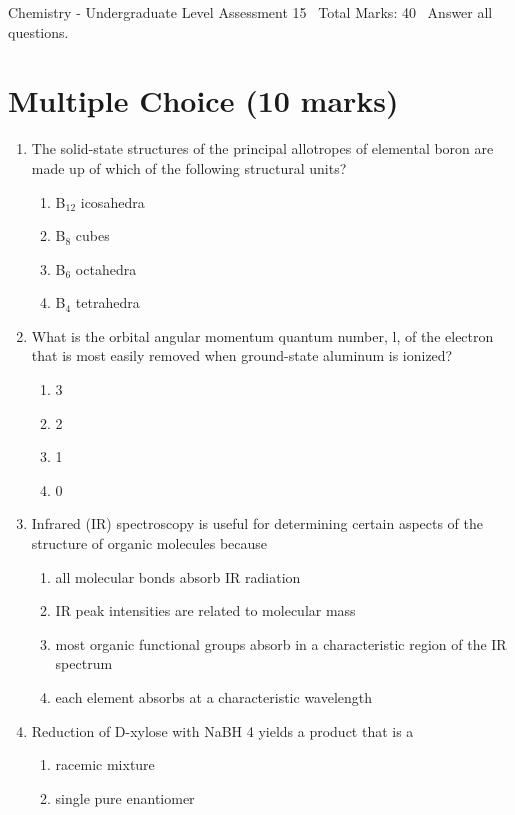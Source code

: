 \documentclass[12pt]{article}
\begin{document}
\begin{center}
Chemistry - Undergraduate Level Assessment 15 \
Total Marks: 40 \
Answer all questions.
\end{center}

\section*{Multiple Choice (10 marks)}
\begin{enumerate}[label=\arabic*.]
\item The solid-state structures of the principal allotropes of elemental boron are made up of which of the following structural units?
\begin{enumerate}[label=(\alph*)]
    \item B$_{12}$ icosahedra
    \item B$_{8}$ cubes
    \item B$_{6}$ octahedra
    \item B$_{4}$ tetrahedra
\end{enumerate}
\item What is the orbital angular momentum quantum number, l, of the electron that is most easily removed when ground-state aluminum is ionized?
\begin{enumerate}[label=(\alph*)]
    \item 3
    \item 2
    \item 1
    \item 0
\end{enumerate}
\item Infrared (IR) spectroscopy is useful for determining certain aspects of the structure of organic molecules because
\begin{enumerate}[label=(\alph*)]
    \item all molecular bonds absorb IR radiation
    \item IR peak intensities are related to molecular mass
    \item most organic functional groups absorb in a characteristic region of the IR spectrum
    \item each element absorbs at a characteristic wavelength
\end{enumerate}
\item Reduction of D-xylose with NaBH 4 yields a product that is a
\begin{enumerate}[label=(\alph*)]
    \item racemic mixture
    \item single pure enantiomer

\end{enumerate}
\end{enumerate}
\end{document}
